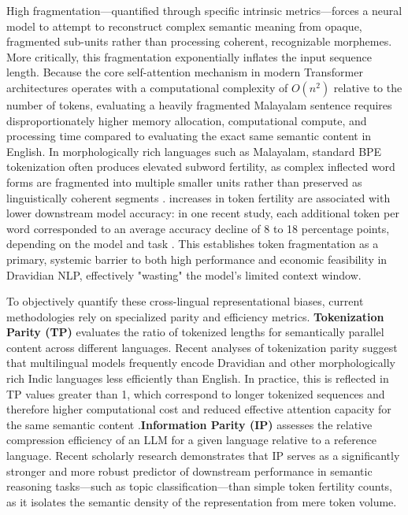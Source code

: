 \documentclass[12pt]{article}
\begin{document}
	High fragmentation—quantified through specific intrinsic metrics—forces a neural model to attempt to reconstruct complex semantic meaning from opaque, fragmented sub-units rather than processing coherent, recognizable morphemes. More critically, this fragmentation exponentially inflates the input sequence length.\cite{} Because the core self-attention mechanism in modern Transformer architectures operates with a computational complexity of $O(n^2)$ relative to the number of tokens, evaluating a heavily fragmented Malayalam sentence requires disproportionately higher memory allocation, computational compute, and processing time compared to evaluating the exact same semantic content in English. In morphologically rich languages such as Malayalam, standard BPE tokenization often produces elevated subword fertility, as complex inflected word forms are fragmented into multiple smaller units rather than preserved as linguistically coherent segments \cite{rana2025indicsupertokenizer,sharma2025multilingual}. increases in token fertility are associated with lower downstream model accuracy: in one recent study, each additional token per word corresponded to an average accuracy decline of 8 to 18 percentage points, depending on the model and task \cite{lundin2025tokentax}. This establishes token fragmentation as a primary, systemic barrier to both high performance and economic feasibility in Dravidian NLP, effectively "wasting" the model's limited context window. 
	
	To objectively quantify these cross-lingual representational biases, current methodologies rely on specialized parity and efficiency metrics. \textbf{Tokenization Parity (TP)} evaluates the ratio of tokenized lengths for semantically parallel content across different languages. Recent analyses of tokenization parity suggest that multilingual models frequently encode Dravidian and other morphologically rich Indic languages less efficiently than English. In practice, this is reflected in TP values greater than 1, which correspond to longer tokenized sequences and therefore higher computational cost and reduced effective attention capacity for the same semantic content \cite{ahia2025tokenizationbias,sharma2025multilingual}.\textbf{Information Parity (IP)} assesses the relative compression efficiency of an LLM for a given language relative to a reference language. Recent scholarly research demonstrates that IP serves as a significantly stronger and more robust predictor of downstream performance in semantic reasoning tasks—such as topic classification—than simple token fertility counts, as it isolates the semantic density of the representation from mere token volume. 
	
\end{document}
